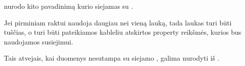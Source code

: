 \documentclass[letterpaper,10pt,lithuanian]{sphinxmanual}
\begin{document}
\begin{fulllineitems}

\pysigstartsignatures
{}
\pysigstopsignatures

\begin{fulllineitems}

\pysigstartsignatures
{}
\pysigstopsignatures
\sphinxAtStartPar
{} nurodo kito {\hyperref[\detokenize{formatas:model}]{}} pavadinimą kurio {\hyperref[\detokenize{dimensijos:model.ref}]{}}
siejamas su {\hyperref[\detokenize{formatas:property}]{}}.

\sphinxAtStartPar
Jei {\hyperref[\detokenize{dimensijos:model.ref}]{}} pirminiam raktui naudoja daugiau nei vieną lauką,
tada {\hyperref[\detokenize{dimensijos:property.source}]{}} laukas turi būti tuščias, o
{\hyperref[\detokenize{dimensijos:property.prepare}]{}} turi būti pateikiamos kableliu atskirtos
property reikšmės, kurios bus naudojamos susiejimui.

\end{fulllineitems}



\begin{fulllineitems}

\pysigstartsignatures
{}
\pysigstopsignatures
\sphinxAtStartPar
Tais atvejais, kai {\hyperref[\detokenize{formatas:property}]{}} duomenys nesutampa su siejamo
{\hyperref[\detokenize{dimensijos:model.ref}]{}}, galima nurodyti {\hyperref[\detokenize{formatas:property}]{}} iš {\hyperref[\detokenize{formatas:model}]{}}.

\end{fulllineitems}



\begin{fulllineitems}


\end{fulllineitems}
\end{fulllineitems}
\end{document}
